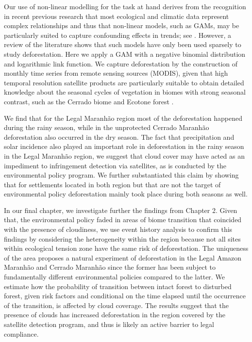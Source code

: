 Our use of non-linear modelling for the task at hand derives from the recognition in recent previous research that most ecological and climatic data represent complex relationships and thus that non-linear models, such as GAMs, may be particularly suited to capture confounding effects in trends; see \citep{alkemad_1998,BELL_2015,JOYE_2015,LUSK_2016,SADAT_2016,HALPERIN_2016, SANTOS_2017,TAPIA_2017, LIU_2018,MORENO_2018}. However, a review of the literature shows that such models have only been used sparsely to study deforestation. Here we apply a GAM with a negative binomial distribution and logarithmic link function. We capture deforestation by the construction of monthly time series from remote sensing sources (MODIS), given that high temporal resolution satellite products are particularly suitable to obtain detailed knowledge about the seasonal cycles of vegetation in biomes with strong seasonal contrast, such as the Cerrado biome and Ecotone forest \citep{bayma_sano_2015}. 

We find that for the Legal Maranhão region most of the deforestation happened during the rainy season, while in the unprotected Cerrado Maranhão deforestation also occurred in the dry season. The fact that precipitation and solar incidence also played an important role in deforestation in the rainy season in the Legal Maranhão region, we suggest that cloud cover may have acted as an impediment to infringement detection via satellites, as is conducted by the environmental policy program. We further substantiated this claim by showing that for settlements located in both region but that are not the target of environmental policy deforestation mainly took place during both seasons as well.     


In our final chapter, we investigate further the findings from  Chapter 2. Given that, the environmental policy faded in areas of biome transition that coincided with the presence of cloudiness, we use event history analysis to confirm this findings by considering the heterogeneity within the region because not all sites within ecological tension zone have the same risk of deforestation. The uniqueness of the area proposes a natural experiment of deforestation in the Legal Amazon Maranhão and Cerrado Maranhão since the former has been subject to fundamentally different environmental policies compared to the latter. We estimate how the probability of transition between intact forest to disturbed forest, given risk factors and conditional on the time elapsed until the occurrence of the transition, is affected by cloud coverage. The results suggest that the presence of clouds has increased deforestation in the region covered by the satellite detection program, and thus is likely an active barrier to legal compliance.  

